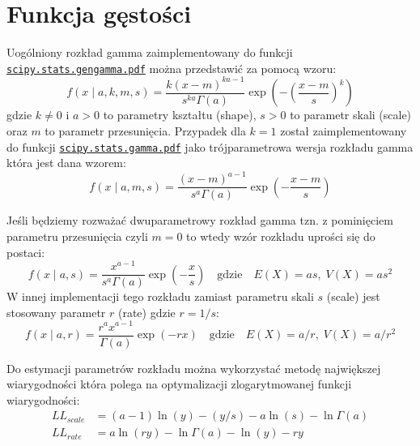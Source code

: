 \documentclass[polish,]{book}
\begin{document}
\hypertarget{R31}{%
\section{Funkcja gęstości}\label{R31}}

Uogólniony rozkład gamma zaimplementowany do funkcji \href{https://docs.scipy.org/doc/scipy/reference/generated/scipy.stats.gengamma.html\#scipy.stats.gengamma}{\texttt{scipy.stats.gengamma.pdf}} można przedstawić za pomocą wzoru:
\begin{equation}
f(x\;|\;a,k,m,s)=\frac{k(x-m)^{ka-1}}{s^{ka}\Gamma(a)}\exp\left(-\left(\frac{x-m}{s}\right)^k\right)
\label{eq:g01}
\end{equation}
gdzie \(k\neq 0\) i \(a>0\) to parametry kształtu (shape), \(s>0\) to parametr skali (scale) oraz \(m\) to parametr przesunięcia.
Przypadek dla \(k=1\) został zaimplementowany do funkcji \href{https://docs.scipy.org/doc/scipy/reference/generated/scipy.stats.gamma.html}{\texttt{scipy.stats.gamma.pdf}} jako trójparametrowa wersja rozkładu gamma która jest dana wzorem:
\begin{equation}
f(x\;|\;a,m,s)=\frac{(x-m)^{a-1}}{s^{a}\Gamma(a)}\exp\left(-\frac{x-m}{s}\right)
\label{eq:g02}
\end{equation}

Jeśli będziemy rozważać dwuparametrowy rozkład gamma tzn. z pominięciem parametru przesunięcia czyli \(m=0\) to wtedy wzór rozkładu uprości się do postaci:
\begin{equation}
f(x\;|\;a,s)=\frac{x^{a-1}}{s^{a}\Gamma(a)}\exp\left(-\frac{x}{s}\right)\quad\mbox{gdzie}\quad E(X)=as,\; V(X)=as^2
\label{eq:g03}
\end{equation}
W innej implementacji tego rozkładu zamiast parametru skali \(s\) (scale) jest stosowany parametr \(r\) (rate) gdzie \(r = 1 / s\):
\begin{equation}
f(x\;|\;a,r)=\frac{r^ax^{a-1}}{\Gamma(a)}\exp(-rx)\quad\mbox{gdzie}\quad E(X)=a/r,\; V(X)=a/r^2
\label{eq:g04}
\end{equation}

Do estymacji parametrów rozkładu można wykorzystać metodę największej wiarygodności która polega na optymalizacji zlogarytmowanej funkcji wiarygodności:
\begin{align}
     LL_{scale} & =(a-1)\ln(y)-(y/s)-a\ln(s)-\ln\Gamma(a) \label{eq:g05}\\
     LL_{rate} & =a\ln(ry)-\ln\Gamma(a)-\ln(y)-ry \label{eq:g06}
  \end{align}
\end{document}

